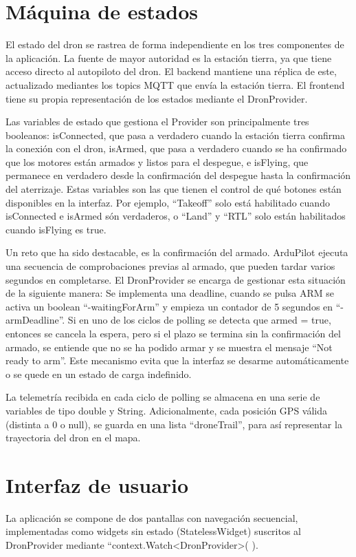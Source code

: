 \section{Máquina de estados}
El estado del dron se rastrea de forma independiente en los tres componentes de la aplicación. La fuente de mayor autoridad es la estación tierra, ya que tiene acceso directo al autopiloto del dron. El backend mantiene una réplica de este, actualizado mediantes los topics MQTT que envía la estación tierra. El frontend tiene su propia representación de los estados mediante el DronProvider.

Las variables de estado que gestiona el Provider son principalmente tres booleanos: isConnected, que pasa a verdadero cuando la estación tierra confirma la conexión con el dron, isArmed, que pasa a verdadero cuando se ha confirmado que los motores están armados y listos para el despegue, e isFlying, que permanece en verdadero desde la confirmación del despegue hasta la confirmación del aterrizaje. Estas variables son las que tienen el control de qué botones están disponibles en la interfaz. Por ejemplo, “Takeoff” solo está habilitado cuando isConnected e isArmed són verdaderos, o “Land” y “RTL” solo están habilitados cuando isFlying es true.

Un reto que ha sido destacable, es la confirmación del armado. ArduPilot ejecuta una secuencia de comprobaciones previas al armado, que pueden tardar varios segundos en completarse. El DronProvider se encarga de gestionar esta situación de la siguiente manera: Se implementa una deadline, cuando se pulsa ARM se activa un boolean “-waitingForArm” y empieza un contador de 5 segundos en “-armDeadline”. Si en uno de los ciclos de polling se detecta que armed = true, entonces se cancela la espera, pero si el plazo se termina sin la confirmación del armado, se entiende que no se ha podido armar y se muestra el mensaje “Not ready to arm”. Este mecanismo evita que la interfaz se desarme automáticamente o se quede en un estado de carga indefinido.

La telemetría recibida en cada ciclo de polling se almacena en una serie de variables de tipo double y String. Adicionalmente, cada posición GPS válida (distinta a 0 o null), se guarda en una lista “droneTrail”, para así representar la trayectoria del dron en el mapa.

\section{Interfaz de usuario}
La aplicación se compone de dos pantallas con navegación secuencial, implementadas como widgets sin estado (StatelessWidget) suscritos al DronProvider mediante “context.Watch<DronProvider>( ).

